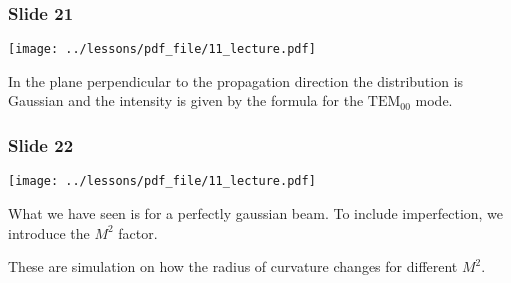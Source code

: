 \documentclass[../main/main.tex]{subfiles}
\begin{document}
\subsubsection*{Slide 21}

\begin{minipage}[]{0.5\linewidth}
\centering
\texttt{[image: ../lessons/pdf\_file/11\_lecture.pdf]}
\end{minipage}
\hspace{0.3cm}\vspace{0.3cm}
\begin{minipage}[c]{0.47\linewidth}

In the plane perpendicular to the propagation direction the distribution is Gaussian and the intensity is given by the formula for the \( \text{TEM}_{00} \) mode.


\end{minipage}

\subsubsection*{Slide 22}

\begin{minipage}[]{0.5\linewidth}
\centering
\texttt{[image: ../lessons/pdf\_file/11\_lecture.pdf]}
\end{minipage}
\hspace{0.3cm}\vspace{0.3cm}
\begin{minipage}[c]{0.47\linewidth}

What we have seen is for a perfectly gaussian beam. To include imperfection, we introduce the \( M^2 \) factor.

These are simulation on how the radius of curvature changes for different \( M^2 \).

\end{minipage}
\end{document}
